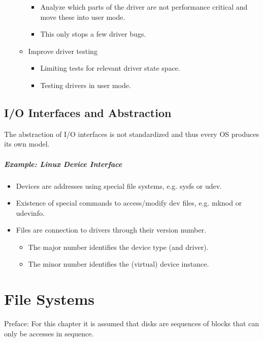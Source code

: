 \begin{itemize}
\begin{itemize}
						\begin{itemize}
							\item Analyze which parts of the driver are not performance critical and move these into user mode.
							\item This only stops a few driver bugs.
						\end{itemize}
					\item Improve driver testing
						\begin{itemize}
							\item Limiting tests for relevant driver state space.
							\item Testing drivers in user mode.
						\end{itemize}
				\end{itemize}
		\end{itemize}

	\section{I/O Interfaces and Abstraction}
		The abstraction of I/O interfaces is not standardized and thus every OS produces its own model.

		\paragraph{Example: Linux Device Interface}
			\begin{itemize}
				\item Devices are addresses using special file systems, e.g. sysfs or udev.
				\item Existence of special commands to access/modify dev files, e.g. mknod or udevinfo.
				\item Files are connection to drivers through their version number.
					\begin{itemize}
						\item The major number identifies the device type (and driver).
						\item The minor number identifies the (virtual) device instance.
					\end{itemize}
			\end{itemize}

\chapter{File Systems}
Preface: For this chapter it is assumed that disks are sequences of blocks that can only be accesses in sequence.

